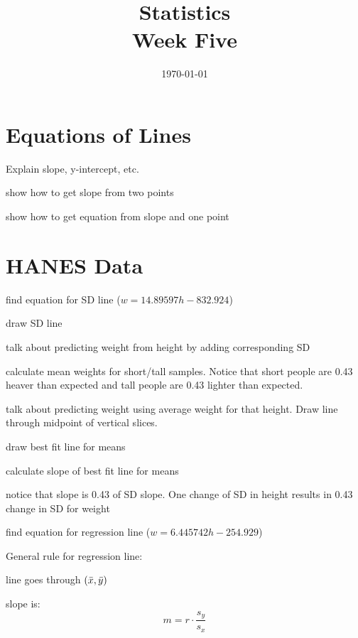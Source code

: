 \documentclass[letterpaper, landscape]{exam}
\title{Statistics \\ Week Five}
\date{\today}
\author{}
\begin{document}
\maketitle
\tableofcontents

  \section{Equations of Lines}
  \begin{itemize*}
    \item Explain slope, y-intercept, etc.
    \item show how to get slope from two points
    \item show how to get equation from slope and one point
  \end{itemize*}

  \section{HANES Data} %

  \begin{enumerate*}
    \item find equation for SD line ($w = 14.89597 h - 832.924$)
    \item draw SD line 
    \item talk about predicting weight from height by adding corresponding SD
    \item calculate mean weights for short/tall samples. Notice that short
      people are 0.43 heaver than expected and tall people are 0.43 lighter than expected.
    \item talk about predicting weight using average weight for that height. Draw line through
      midpoint of vertical slices.
    \item draw best fit line for means
    \item calculate slope of best fit line for means
    \item notice that slope is 0.43 of SD slope. One change of SD in height results in 0.43
      change in SD for weight
    \item find equation for regression line ($w = 6.445742h - 254.929$)
  \end{enumerate*}
  
  General rule for regression line:
  \begin{itemize*}
    \item line goes through $\del{ \bar{x}, \bar{y} }$ 
    \item slope is:
      \[
        m = r \cdot \frac{s_y}{s_x}
      \]
  \end{itemize*}
\end{document}
